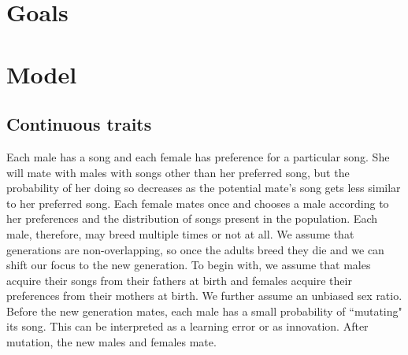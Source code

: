 \documentclass{article}
\begin{document}
\section{Goals}

\section{Model}

\subsection{Continuous traits }

Each male has a song and each female has preference for a particular song. She will mate with males with songs other than her preferred song, but the probability of her doing so decreases as the potential mate's song gets less similar to her preferred song. Each female mates once and chooses a male according to her preferences and the distribution of songs present in the population. Each male, therefore, may breed multiple times or not at all. We assume that generations are non-overlapping, so once the adults breed they die and we can shift our focus to the new generation. To begin with, we assume that males acquire their songs from their fathers at birth and females acquire their preferences from their mothers at birth. We further assume an unbiased sex ratio. Before the new generation mates, each male has a small probability of ``mutating" its song. This can be interpreted as a learning error or as innovation. After mutation, the new males and females mate. 
\end{document}
